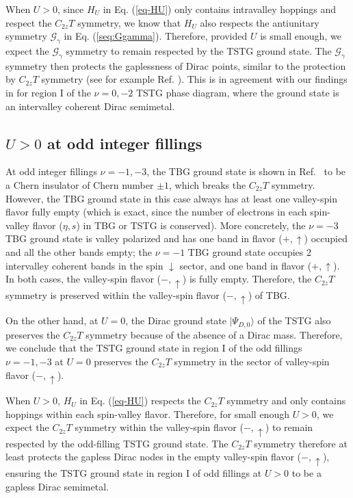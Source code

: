 \documentclass[prb,aps,nofootinbib,amssymb,twocolumn,superscriptaddress,10pt]{revtex4-2}
\begin{document}
\begin{widetext}
When $U>0$, since $H_U$ in Eq. (\ref{eq-HU}) only contains intravalley hoppings and respect the $C_{2z}T$ symmetry, we know that $H_U$ also respects the antiunitary symmetry $\mathcal{G}_\gamma$ in Eq. (\ref{seq:Ggamma}). Therefore, provided $U$ is small enough, we expect the $\mathcal{G}_\gamma$ symmetry to remain respected by the TSTG ground state. The $\mathcal{G}_\gamma$ symmetry then protects the gaplessness of Dirac points, similar to the protection by $C_{2z}T$ symmetry (see for example Ref. \cite{SON20b}). This is in agreement with our findings in for region I of the $\nu=0,-2$ TSTG phase diagram, where the ground state is an intervalley coherent Dirac semimetal.

\subsection{\texorpdfstring{$U>0$}{U>0} at odd integer fillings}

At odd integer fillings $\nu=-1,-3$, the TBG ground state is shown in Ref.~\cite{LIA20} to be a Chern insulator of Chern number $\pm1$, which breaks the $C_{2z}T$ symmetry. However, the TBG ground state in this case always has at least one valley-spin flavor fully empty (which is exact, since the number of electrons in each spin-valley flavor ($\eta,s$) in TBG or TSTG is conserved). More concretely, the $\nu=-3$ TBG ground state is valley polarized and has one band in flavor ($+,\uparrow$) occupied and all the other bands empty; the $\nu=-1$ TBG ground state occupies 2 intervalley coherent bands in the spin $\downarrow$ sector, and one band in flavor ($+,\uparrow$). In both cases, the valley-spin flavor ($-,\uparrow$) is fully empty. Therefore, the $C_{2z}T$ symmetry is preserved within the valley-spin flavor ($-,\uparrow$) of TBG. 

On the other hand, at $U=0$, the Dirac ground state $|\Psi_{D,0}\rangle$ of the TSTG also preserves the $C_{2z}T$ symmetry because of the absence of a Dirac mass. Therefore, we conclude that the TSTG ground state in region I of the odd fillings $\nu=-1,-3$ at $U=0$ preserves the $C_{2z}T$ symmetry in the sector of valley-spin flavor ($-,\uparrow$).

When $U>0$, $H_U$ in Eq. (\ref{eq-HU}) respects the $C_{2z}T$ symmetry and only contains hoppings within each spin-valley flavor. Therefore, for small enough $U>0$, we expect the $C_{2z}T$ symmetry within the valley-spin flavor ($-,\uparrow$) to remain respected by the odd-filling TSTG ground state. The $C_{2z}T$ symmetry therefore at least protects the gapless Dirac nodes in the empty valley-spin flavor ($-,\uparrow$), ensuring the TSTG ground state in region I of odd fillings at $U>0$ to be a gapless Dirac semimetal.

\end{widetext}
\end{document}
